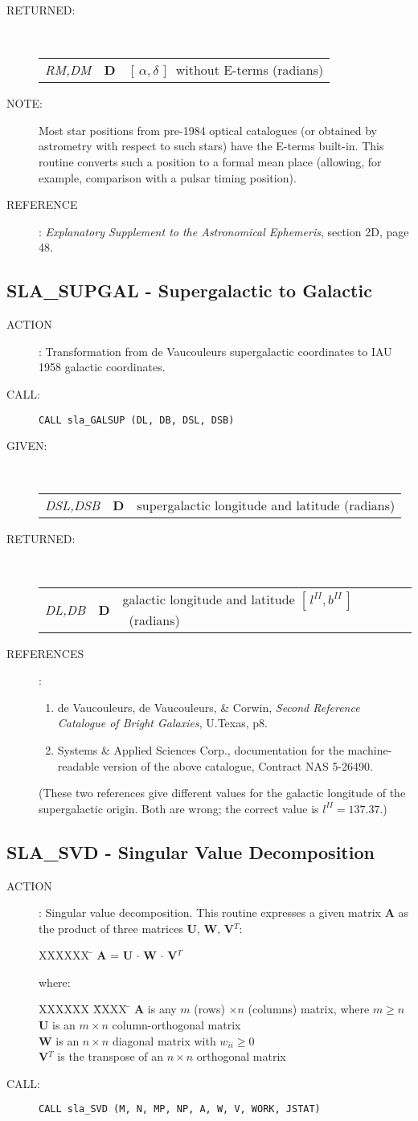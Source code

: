 \documentclass[11pt,twoside]{article}
\newcommand{\xlabel}[1]{}
\newcommand{\radec}     {$[\,\alpha,\delta\,]$}
\newcommand{\gal}       {$[\,l^{I\!I},b^{I\!I}\,]$}
\newcommand{\routine}[3]
{\hbadness=10000
  \vbox
  {
    \rule{\textwidth}{0.3mm}\\
    {\Large {\bf #1} \hfill #2 \hfill {\bf #1}}\\
    \setlength{\oldspacing}{\topsep}
    \setlength{\topsep}{0.3ex}
    \begin{description}
      #3
    \end{description}
    \setlength{\topsep}{\oldspacing}
  }
}
\renewcommand{\routine}[3]
   {
      \subsection{#1\xlabel{#1} - #2\label{#1}}
       \begin{description}
         #3
       \end{description}
   }
\newcommand{\action}[1]
{\item[ACTION]: #1}
\newcommand{\action}[1]
   {\item[ACTION:] #1}
\newcommand{\call}[1]
{\item[CALL]: \hspace{0.4em}{\tt #1}}
\newlength{\oldspacing}
\renewcommand{\call}[1]
   {
    \item[CALL:] {\tt #1}
   }
\newcommand{\args}[2]
{
  \goodbreak
  \setlength{\oldspacing}{\topsep}
  \setlength{\topsep}{0.3ex}
  \begin{description}
  \item[#1]:\\[1.5ex]
    \begin{tabular}{p{7em}p{6em}p{22em}}
      #2
    \end{tabular}
  \end{description}
  \setlength{\topsep}{\oldspacing}
}
\renewcommand{\args}[2]
   {
     \begin{description}
        \item[#1:]\\
        \begin{tabular}{p{7em}p{6em}l}
           #2
        \end{tabular}
     \end{description}
   }
\newcommand{\spec}[3]
{
  {\em {#1}} & {\bf \mbox{#2}} & {#3}
}
\newcommand{\anote}[1]
{
  \goodbreak
  \setlength{\oldspacing}{\topsep}
  \setlength{\topsep}{0.3ex}
  \begin{description}
    \item[NOTE]:
        #1
  \end{description}
  \setlength{\topsep}{\oldspacing}
}
\renewcommand{\anote}[1]
   {
      \begin{description}
      \item[NOTE:]
          #1
      \end{description}
   }
\newcommand{\aref}[1]
{
  \goodbreak
  \setlength{\oldspacing}{\topsep}
  \setlength{\topsep}{0.3ex}
  \begin{description}
    \item[REFERENCE]:
        #1
  \end{description}
  \setlength{\topsep}{\oldspacing}
}
\newcommand{\aref}[1]
   {
     \begin{description}
       \item[REFERENCE:]
           #1
     \end{description}
   }
\newcommand{\refs}[1]
{
  \goodbreak
  \setlength{\oldspacing}{\topsep}
  \setlength{\topsep}{0.3ex}
  \begin{description}
    \item[REFERENCES]:
        #1
  \end{description}
  \setlength{\topsep}{\oldspacing}
}
\newcommand{\refs}[1]
   {
     \begin{description}
       \item[REFERENCES:]
           #1
     \end{description}
   }
\begin{document}
\args{RETURNED}
{
 \spec{RM,DM}{D}{\radec\ without E-terms (radians)}
}
\anote{Most star positions from pre-1984 optical catalogues (or
       obtained by astrometry with respect to such stars) have the
       E-terms built-in.  This routine converts such a position to a
       formal mean place (allowing, for example, comparison with a
       pulsar timing position).}
\aref{{\it Explanatory Supplement to the Astronomical Ephemeris},
      section 2D, page 48.}
\routine{SLA\_SUPGAL}{Supergalactic to Galactic}
{
 \action{Transformation from de Vaucouleurs supergalactic coordinates
         to IAU 1958 galactic coordinates.}
 \call{CALL sla\_GALSUP (DL, DB, DSL, DSB)}
}
\args{GIVEN}
{
 \spec{DSL,DSB}{D}{supergalactic longitude and latitude (radians)}
}
\args{RETURNED}
{
 \spec{DL,DB}{D}{galactic longitude and latitude \gal\ (radians)}
}
\refs
{
 \begin{enumerate}
  \item de Vaucouleurs, de Vaucouleurs, \& Corwin, {\it Second Reference
    Catalogue of Bright Galaxies}, U.Texas, p8.
  \item Systems \& Applied Sciences Corp., documentation for the
        machine-readable version of the above catalogue,
        Contract NAS 5-26490.
 \end{enumerate}
 (These two references give different values for the galactic
 longitude of the supergalactic origin.  Both are wrong;  the
 correct value is $l^{I\!I}=137.37$.)
}
\routine{SLA\_SVD}{Singular Value Decomposition}
{
 \action{Singular value decomposition.
         This routine expresses a given matrix {\bf A} as the product of
         three matrices {\bf U}, {\bf W}, {\bf V}$^{T}$:
         \begin{tabbing}
         XXXXXX \= \kill
         \> {\bf A} = {\bf U} $\cdot$ {\bf W} $\cdot$ {\bf V}$^{T}$
         \end{tabbing}
         where:
         \begin{tabbing}
         XXXXXX \= XXXX \= \kill
         \> {\bf A} \> is any $m$ (rows) $\times n$ (columns) matrix,
                       where $m \geq n$ \\
         \> {\bf U} \> is an $m \times n$ column-orthogonal matrix \\
         \> {\bf W} \> is an $n \times n$ diagonal matrix with
                       $w_{ii} \geq 0$ \\
         \> {\bf V}$^{T}$ \> is the transpose of an $n \times n$
                             orthogonal matrix
\end{tabbing}
}
 \call{CALL sla\_SVD (M, N, MP, NP, A, W, V, WORK, JSTAT)}
}
\end{document}
